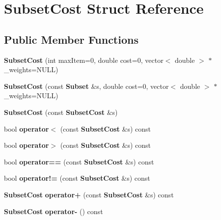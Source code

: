 \section{Subset\+Cost Struct Reference}
\label{structSubsetCost}
\subsection*{Public Member Functions}
\begin{DoxyCompactItemize}
\item 
{\bfseries Subset\+Cost} (int max\+Item=0, double cost=0, vector$<$ double $>$ $\ast$\+\_\+weights=N\+U\+LL)\label{structSubsetCost_a5cd325a13426f6241c30e43e8abbbd7c}

\item 
{\bfseries Subset\+Cost} (const {\bf Subset} \&s, double cost=0, vector$<$ double $>$ $\ast$\+\_\+weights=N\+U\+LL)\label{structSubsetCost_af2a38a5b2d3ff85815549073c5a96c5d}

\item 
{\bfseries Subset\+Cost} (const {\bf Subset\+Cost} \&s)\label{structSubsetCost_afdad501aea359a73818fa7c4ca8dc730}

\item 
bool {\bfseries operator$<$} (const {\bf Subset\+Cost} \&s) const \label{structSubsetCost_aa8a97601359c65b13fca740e4c4e89b0}

\item 
bool {\bfseries operator$>$} (const {\bf Subset\+Cost} \&s) const \label{structSubsetCost_a06643beecbf5fd9e6b2c66c7b78e057f}

\item 
bool {\bfseries operator==} (const {\bf Subset\+Cost} \&s) const \label{structSubsetCost_adcc0d15e669cfa27156e6c92e3f48b7e}

\item 
bool {\bfseries operator!=} (const {\bf Subset\+Cost} \&s) const \label{structSubsetCost_aa13cfb493fa628c3efa475560ec4d0c5}

\item 
{\bf Subset\+Cost} {\bfseries operator+} (const {\bf Subset\+Cost} \&s) const \label{structSubsetCost_a4db9ca0682d964dc0ceec7f2c94cb6ca}

\item 
{\bf Subset\+Cost} {\bfseries operator-\/} () const \label{structSubsetCost_a050ecb7cb0a7ffed6bd362c80f572101}

\end{DoxyCompactItemize}
